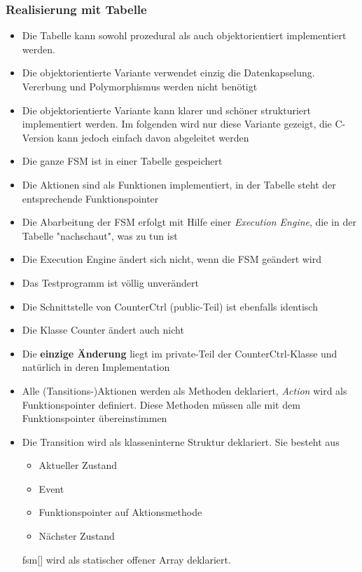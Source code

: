 \subsubsection{Realisierung mit Tabelle}
\begin{itemize}
      \item Die Tabelle kann sowohl prozedural als auch objektorientiert implementiert werden.
      \item Die objektorientierte Variante verwendet einzig die Datenkapselung. Vererbung und Polymorphismus werden nicht benötigt
      \item Die objektorientierte Variante kann klarer und schöner strukturiert implementiert werden. Im folgenden wird nur diese Variante gezeigt, die C-Version kann jedoch einfach davon abgeleitet werden
      \item Die ganze FSM ist in einer Tabelle gespeichert
      \item Die Aktionen sind als Funktionen implementiert, in der Tabelle steht der entsprechende Funktionspointer
      \item Die Abarbeitung der FSM erfolgt mit Hilfe einer \textit{Execution Engine}, die in der Tabelle "nachschaut", was zu tun ist
      \item Die Execution Engine ändert sich nicht, wenn die FSM geändert wird
      \item Das Testprogramm ist völlig unverändert
      \item Die Schnittstelle von CounterCtrl (public-Teil) ist ebenfalls identisch
      \item Die Klasse Counter ändert auch nicht
      \item Die \textbf{einzige Änderung} liegt im private-Teil der
            CounterCtrl-Klasse und natürlich in deren Implementation
      \item Alle (Tansitions-)Aktionen werden als Methoden deklariert,
            \textit{Action} wird als Funktionspointer definiert. Diese Methoden müssen
            alle mit dem Funktionspointer übereinstimmen
            

      \item Die Transition wird als klasseninterne Struktur deklariert. Sie besteht
            aus
            \begin{itemize}
                  \item Aktueller Zustand
                  \item Event
                  \item Funktionspointer auf Aktionsmethode
                  \item Nächster Zustand
            \end{itemize}
            fsm[] wird als statischer offener Array deklariert.
            


\end{itemize}
